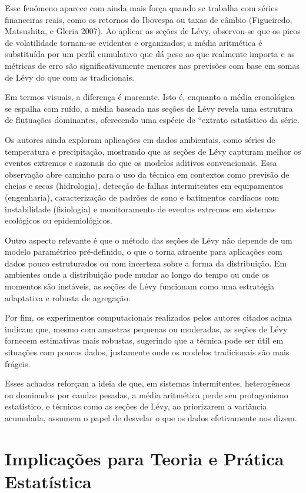 \documentclass[
  letterpaper,
  DIV=11,
  numbers=noendperiod]{scrartcl}
\begin{document}
Esse fenômeno aparece com ainda mais força quando se trabalha com séries
financeiras reais, como os retornos do Ibovespa ou taxas de câmbio
(Figueiredo, Matsushita, e Gleria 2007). Ao aplicar as seções de Lévy,
observou-se que os picos de volatilidade tornam-se evidentes e
organizados; a média aritmética é substituída por um perfil cumulativo
que dá peso ao que realmente importa e as métricas de erro são
significativamente menores nas previsões com base em somas de Lévy do
que com as tradicionais.

Em termos visuais, a diferença é marcante. Isto é, enquanto a média
cronológica se espalha com ruído, a média baseada nas seções de Lévy
revela uma estrutura de flutuações dominantes, oferecendo uma espécie de
``extrato estatístico da série.

Os autores ainda exploram aplicações em dados ambientais, como séries de
temperatura e precipitação, mostrando que as seções de Lévy capturam
melhor os eventos extremos e sazonais do que os modelos aditivos
convencionais. Essa observação abre caminho para o uso da técnica em
contextos como previsão de cheias e secas (hidrologia), detecção de
falhas intermitentes em equipamentos (engenharia), caracterização de
padrões de sono e batimentos cardíacos com instabilidade (fisiologia) e
monitoramento de eventos extremos em sistemas ecológicos ou
epidemiológicos.

Outro aspecto relevante é que o método das seções de Lévy não depende de
um modelo paramétrico pré-definido, o que o torna atraente para
aplicações com dados pouco estruturados ou com incerteza sobre a forma
da distribuição. Em ambientes onde a distribuição pode mudar ao longo do
tempo ou onde os momentos são instáveis, as seções de Lévy funcionam
como uma estratégia adaptativa e robusta de agregação.

Por fim, os experimentos computacionais realizados pelos autores citados
acima indicam que, mesmo com amostras pequenas ou moderadas, as seções
de Lévy fornecem estimativas mais robustas, sugerindo que a técnica pode
ser útil em situações com poucos dados, justamente onde os modelos
tradicionais são mais frágeis.

Esses achados reforçam a ideia de que, em sistemas intermitentes,
heterogêneos ou dominados por caudas pesadas, a média aritmética perde
seu protagonismo estatístico, e técnicas como as seções de Lévy, ao
priorizarem a variância acumulada, assumem o papel de desvelar o que os
dados efetivamente nos dizem.

\section{Implicações para Teoria e Prática
Estatística}\label{implicauxe7uxf5es-para-teoria-e-pruxe1tica-estatuxedstica}
\end{document}
